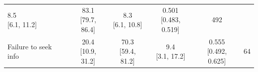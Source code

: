 {\begin{longtable}{l c c c c c}
        \makecell{8.5 \\ \footnotesize{[6.1, 11.2]}} &
        \makecell{83.1 \\ \footnotesize{[79.7, 86.4]}} &
        \makecell{8.3 \\ \footnotesize{[6.1, 10.8]}} &
        \makecell{0.501 \\ \footnotesize{[0.483, 0.519]}} &
        492 \\
    Failure to seek info &
        \makecell{20.4 \\ \footnotesize{[10.9, 31.2]}} &
        \makecell{70.3 \\ \footnotesize{[59.4, 81.2]}} &
        \makecell{9.4 \\ \footnotesize{[3.1, 17.2]}} &
        \makecell{0.555 \\ \footnotesize{[0.492, 0.625]}} &
        64 \\
    \midrule


\end{longtable}}
